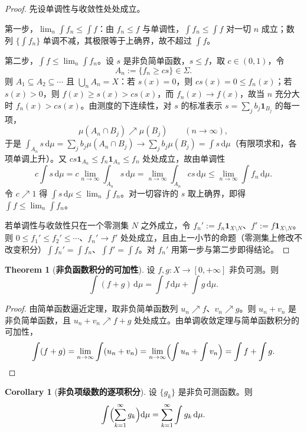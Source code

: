 \documentclass[oneside]{book}
\theoremstyle{definition}
\newcommand{\dd}{\mathrm{d}}
\theoremstyle{definition}
\newtheorem{theorem}{Theorem}[section]
\newtheorem{corollary}{Corollary}[section]
\begin{document}
	\begin{proof}
		先设单调性与收敛性处处成立。
		
		第一步，$\lim_n\int f_n\leqslant\int f$：由 $f_n\leqslant f$ 与单调性，$\int f_n\leqslant\int f$ 对一切 $n$ 成立；数列 $\{\int f_n\}$ 单调不减，其极限等于上确界，故不超过 $\int f$。
		
		第二步，$\int f\leqslant\lim_n\int f_n$。设 $s$ 是非负简单函数，$s\leqslant f$，取 $c\in(0,1)$，令
		\[
		A_n:=\{f_n\geqslant cs\}\in\Sigma .
		\]
		则 $A_1\subseteq A_2\subseteq\cdots$ 且 $\bigcup_n A_n=X$：若 $s(x)=0$，则 $cs(x)=0\leqslant f_n(x)$；若 $s(x)>0$，则 $f(x)\geqslant s(x)>cs(x)$，而 $f_n(x)\to f(x)$，故当 $n$ 充分大时 $f_n(x)>cs(x)$。由测度的下连续性，对 $s$ 的标准表示 $s=\sum_j b_j\mathbf{1}_{B_j}$ 的每一项，
		\[
		\mu(A_n\cap B_j)\nearrow\mu(B_j)\qquad(n\to\infty),
		\]
		于是 $\int_{A_n}s\,\dd\mu=\sum_j b_j\mu(A_n\cap B_j)\to\sum_j b_j\mu(B_j)=\int s\,\dd\mu$（有限项求和，各项单调上升）。又 $cs\mathbf{1}_{A_n}\leqslant f_n\mathbf{1}_{A_n}\leqslant f_n$ 处处成立，故由单调性
		\[
		c\int s\,\dd\mu=c\lim_{n\to\infty}\int_{A_n}s\,\dd\mu=\lim_{n\to\infty}\int_{A_n}cs\,\dd\mu\leqslant\lim_{n\to\infty}\int f_n\,\dd\mu .
		\]
		令 $c\nearrow1$ 得 $\int s\,\dd\mu\leqslant\lim_n\int f_n$。对一切容许的 $s$ 取上确界，即得 $\int f\leqslant\lim_n\int f_n$。
		
		若单调性与收敛性只在一个零测集 $N$ 之外成立，令 $f_n':=f_n\mathbf{1}_{X\setminus N}$、$f':=f\mathbf{1}_{X\setminus N}$。则 $0\leqslant f_1'\leqslant f_2'\leqslant\cdots$、$f_n'\to f'$ 处处成立，且由上一小节的命题（零测集上修改不改变积分）$\int f_n'=\int f_n$、$\int f'=\int f$。对 $f_n'$ 用第一步与第二步即得结论。
	\end{proof}
	
	\begin{theorem}[\bfseries{非负函数积分的可加性}]
		设 $f,g:X\to[0,+\infty]$ 非负可测。则
		\[
		\int(f+g)\,\dd\mu=\int f\,\dd\mu+\int g\,\dd\mu .
		\]
	\end{theorem}
	
	\begin{proof}
		由简单函数逼近定理，取非负简单函数列 $u_n\nearrow f$、$v_n\nearrow g$。则 $u_n+v_n$ 是非负简单函数，且 $u_n+v_n\nearrow f+g$ 处处成立。由单调收敛定理与简单函数积分的可加性，
		\[
		\int(f+g)=\lim_{n\to\infty}\int(u_n+v_n)=\lim_{n\to\infty}\Bigl(\int u_n+\int v_n\Bigr)=\int f+\int g .\qedhere
		\]
	\end{proof}
	
	\begin{corollary}[\bfseries{非负项级数的逐项积分}]
		设 $\{g_k\}$ 是非负可测函数。则
		\[
		\int\Bigl(\sum_{k=1}^{\infty}g_k\Bigr)\dd\mu=\sum_{k=1}^{\infty}\int g_k\,\dd\mu .
		\]
	\end{corollary}
	
\end{document}
